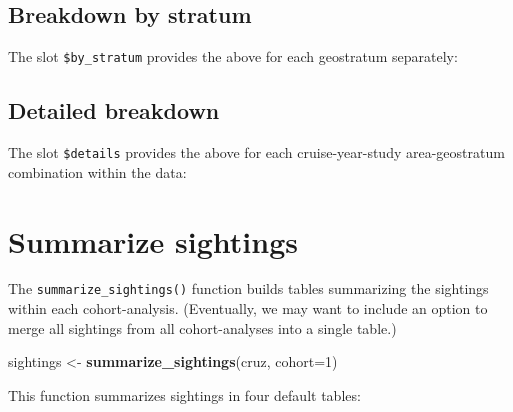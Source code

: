 \documentclass[
]{book}
\newenvironment{Shaded}{\begin{snugshade}}{\end{snugshade}}
\newcommand{\DataTypeTok}[1]{\textcolor[rgb]{0.13,0.29,0.53}{#1}}
\newcommand{\DecValTok}[1]{\textcolor[rgb]{0.00,0.00,0.81}{#1}}
\newcommand{\KeywordTok}[1]{\textcolor[rgb]{0.13,0.29,0.53}{\textbf{#1}}}
\newcommand{\NormalTok}[1]{#1}
\newcommand{\OperatorTok}[1]{\textcolor[rgb]{0.81,0.36,0.00}{\textbf{#1}}}
\newcommand{\StringTok}[1]{\textcolor[rgb]{0.31,0.60,0.02}{#1}}
\begin{document}
\hypertarget{breakdown-by-stratum}{%
\subsection*{Breakdown by stratum}\label{breakdown-by-stratum}}

The slot \texttt{\$by\_stratum} provides the above for each geostratum separately:

\hypertarget{detailed-breakdown}{%
\subsection*{Detailed breakdown}\label{detailed-breakdown}}

The slot \texttt{\$details} provides the above for each cruise-year-study area-geostratum combination within the data:

\hypertarget{summarize-sightings}{%
\section*{Summarize sightings}\label{summarize-sightings}}

The \texttt{summarize\_sightings()} function builds tables summarizing the sightings within each cohort-analysis. (Eventually, we may want to include an option to merge all sightings from all cohort-analyses into a single table.)

\begin{Shaded}
\begin{Highlighting}[]
\NormalTok{sightings <-}\StringTok{ }\KeywordTok{summarize_sightings}\NormalTok{(cruz,}
                                 \DataTypeTok{cohort=}\DecValTok{1}\NormalTok{)}
\end{Highlighting}
\end{Shaded}

This function summarizes sightings in four default tables:

\begin{Shaded}
\end{Shaded}
\end{document}
